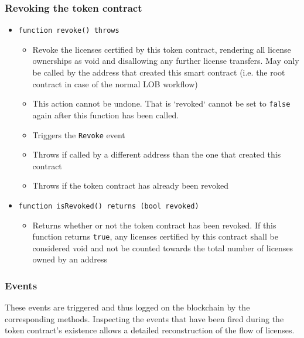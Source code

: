 \documentclass[a4paper]{article}
\begin{document}
\subsubsection{Revoking the token contract}

\begin{itemize}  
  \item \texttt{function revoke() throws}
  \begin{itemize}
    \item Revoke the licenses certified by this token contract, rendering all license ownerships as void and disallowing any further license transfers. May only be called by the address that created this smart contract (i.e. the root contract in case of the normal LOB workflow)
    
    \item This action cannot be undone. That is `revoked` cannot be set to \texttt{false} again after this function has been called.
    \item Triggers the \texttt{Revoke} event
    \item Throws if called by a different address than the one that created this contract
    \item Throws if the token contract has already been revoked
  \end{itemize}
  
  \item \texttt{function isRevoked() returns (bool revoked)}
  \begin{itemize}
    \item Returns whether or not the token contract has been revoked. If this function returns \texttt{true}, any licenses certified by this contract shall be considered void and not be counted towards the total number of licenses owned by an address
  \end{itemize}
\end{itemize}

\subsubsection{Events}

These events are triggered and thus logged on the blockchain by the corresponding methods. Inspecting the events that have been fired during the token contract's existence allows a detailed reconstruction of the flow of licenses.
\end{document}
